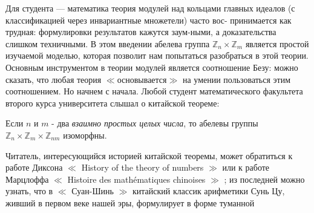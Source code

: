 \documentclass{mai_book}
\begin{document}
Для студента --- математика теория модулей над кольцами главных \linebreak идеалов (с классификацией через инвариантные множетели) часто вос- \linebreak принимается как трудная: формулировки результатов кажутся заум-\linebreak ными, а доказательства слишком техничными. В этом введении абелева \linebreak группа $\mathbb{Z}_n \times \mathbb{Z}_m$ является простой изучаемой моделью, которая позволит \linebreak нам попытаться разобраться в этой теории. Основным инструментом в \linebreak теории модулей является соотношение Безу: можно сказать, что любая \linebreak теория $\ll$основывается$\gg$ на умении пользоваться этим соотношением. Но \linebreak начнем с начала. Любой студент математического факультета второго \linebreak курса университета слышал о китайской теореме: 
\begin{thm}

Если $n$ и $m$ - два \textit{ взаимно простых целых числа}, то абелевы группы \linebreak $\mathbb{Z}_n \times\mathbb{Z}_m\times\mathbb{Z}_{nm}$ изоморфны.
\end{thm}
  Читатель, интересующийся историей китайской теоремы, может \linebreak обратиться к работе Диксона $\ll$ History of the theory of numbers $\gg$ или к работе Марцлоффа $\ll$ Histoire des mathématiques chinoises $\gg$ ; из последней \linebreak можно узнать, что в $\ll$ Суан-Шинь $\gg$ китайский классик арифметики Сунь \linebreak Цу, живший в первом веке нашей эры, формулирует в форме туманной 
\end{document}
